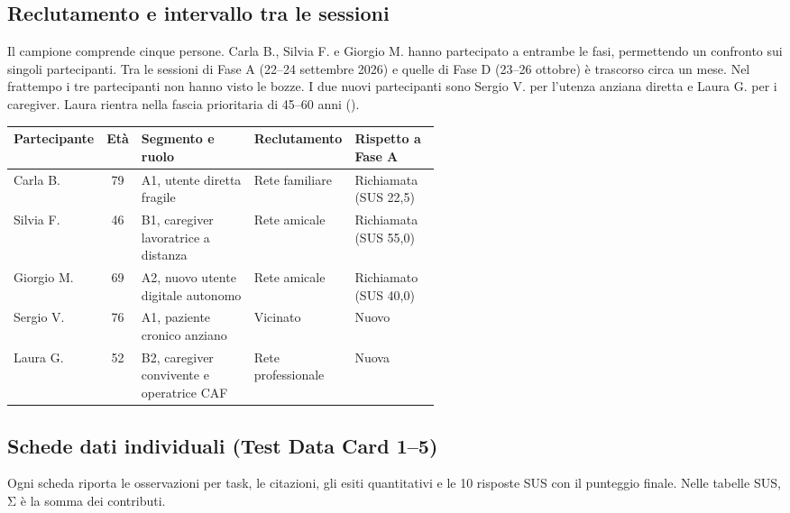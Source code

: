 \subsection{Reclutamento e intervallo tra le sessioni}

Il campione comprende cinque persone. Carla B., Silvia F. e Giorgio M. hanno partecipato a entrambe le fasi, permettendo un confronto sui singoli partecipanti. Tra le sessioni di Fase A (22--24 settembre 2026) e quelle di Fase D (23--26 ottobre) è trascorso circa un mese. Nel frattempo i tre partecipanti non hanno visto le bozze. I due nuovi partecipanti sono Sergio V. per l'utenza anziana diretta e Laura G. per i caregiver. Laura rientra nella fascia prioritaria di 45--60 anni ().

\begin{center}
\label{tab:d-participants}
\footnotesize
\begin{tabularx}{\linewidth}{@{}>{\raggedright\arraybackslash}p{0.14\linewidth} c >{\raggedright\arraybackslash}X >{\raggedright\arraybackslash}p{0.21\linewidth} >{\raggedright\arraybackslash}p{0.2\linewidth}@{}}
\toprule
\textbf{Partecipante} & \textbf{Età} & \textbf{Segmento e ruolo} & \textbf{Reclutamento} & \textbf{Rispetto a Fase A} \\
\midrule
Carla B. & 79 & A1, utente diretta fragile & Rete familiare & Richiamata (SUS 22,5) \\
\addlinespace[2pt]
Silvia F. & 46 & B1, caregiver lavoratrice a distanza & Rete amicale & Richiamata (SUS 55,0) \\
\addlinespace[2pt]
Giorgio M. & 69 & A2, nuovo utente digitale autonomo & Rete amicale & Richiamato (SUS 40,0) \\
\addlinespace[2pt]
Sergio V. & 76 & A1, paziente cronico anziano & Vicinato & Nuovo \\
\addlinespace[2pt]
Laura G. & 52 & B2, caregiver convivente e operatrice CAF & Rete professionale & Nuova \\
\bottomrule
\end{tabularx}
\end{center}

\subsection{Schede dati individuali (Test Data Card 1--5)}

Ogni scheda riporta le osservazioni per task, le citazioni, gli esiti quantitativi e le 10 risposte SUS con il punteggio finale. Nelle tabelle SUS, Σ è la somma dei contributi.

